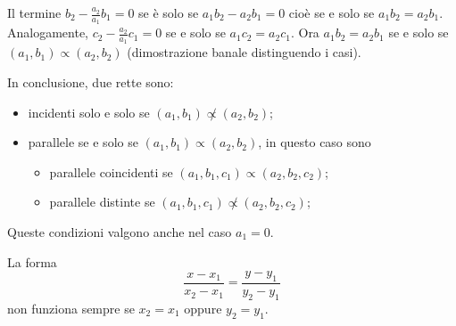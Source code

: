 \documentclass[a4paper]{article}
\begin{document}
Il termine \(b_2 - \frac{a_2}{a_1}b_1 = 0\) se è solo se \(a_1b_2 - a_2b_1 = 0\)
cioè se e solo se \(a_1b_2 = a_2b_1\).
Analogamente, \(c_2 - \frac{a_2}{a_1}c_1 = 0\) se e solo se \(a_1c_2 = a_2c_1\).
Ora \(a_1b_2 = a_2b_1\) se e solo se \((a_1,b_1) \propto (a_2, b_2)\) (dimostrazione banale distinguendo i casi).

In conclusione, due rette sono:
\begin{itemize}
    \item incidenti solo e solo se \((a_1, b_1) \not\propto (a_2, b_2)\);
    \item parallele se e solo se \((a_1, b_1) \propto (a_2, b_2)\),
        in questo caso sono
        \begin{itemize}
            \item parallele coincidenti se \((a_1, b_1, c_1) \propto (a_2, b_2, c_2)\);
            \item parallele distinte se \((a_1, b_1, c_1) \not\propto (a_2, b_2, c_2)\);
        \end{itemize}
\end{itemize}

Queste condizioni valgono anche nel caso \(a_1=0\).



La forma
\[
    \frac{x-x_1}{x_2-x_1} = \frac{y-y_1}{y_2-y_1}
\]
non funziona sempre se \(x_2=x_1\) oppure \(y_2=y_1\).

\end{document}
